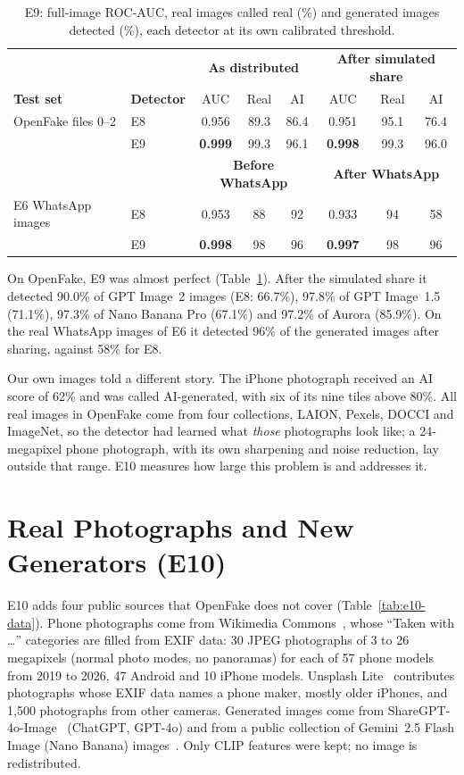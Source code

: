 \documentclass{mnnit}
\begin{document}
\begin{table}[htbp]
\centering
\caption{E9: full-image \mbox{ROC-AUC}, real images called real (\%) and generated images detected (\%), each detector at its own calibrated threshold.}
\label{tab:e9}
\small
\setlength{\tabcolsep}{4pt}
\begin{tabular}{ll|ccc|ccc}
\toprule
 & & \multicolumn{3}{c|}{\textbf{As distributed}} & \multicolumn{3}{c}{\textbf{After simulated share}}\\
\textbf{Test set} & \textbf{Detector} & AUC & Real & AI & AUC & Real & AI\\
\midrule
OpenFake files 0--2 & E8 & 0.956 & 89.3 & 86.4 & 0.951 & 95.1 & 76.4\\
 & E9 & \textbf{0.999} & 99.3 & 96.1 & \textbf{0.998} & 99.3 & 96.0\\
\midrule
 & & \multicolumn{3}{c|}{\textbf{Before WhatsApp}} & \multicolumn{3}{c}{\textbf{After WhatsApp}}\\
E6 WhatsApp images & E8 & 0.953 & 88 & 92 & 0.933 & 94 & 58\\
 & E9 & \textbf{0.998} & 98 & 96 & \textbf{0.997} & 98 & 96\\
\bottomrule
\end{tabular}
\end{table}

On OpenFake, E9 was almost perfect (Table~\ref{tab:e9}). After the
simulated share it detected 90.0\% of GPT Image~2 images (E8: 66.7\%),
97.8\% of GPT Image~1.5 (71.1\%), 97.3\% of Nano Banana Pro (67.1\%) and
97.2\% of Aurora (85.9\%). On the real WhatsApp images of E6 it detected
96\% of the generated images after sharing, against 58\% for E8.

Our own images told a different story. The iPhone photograph received an
AI score of 62\% and was called AI-generated, with six of its nine
tiles above 80\%. All real images in OpenFake come from four collections,
LAION, Pexels, DOCCI and ImageNet, so the detector had learned what \emph{those}
photographs look like; a 24-megapixel phone photograph, with its own
sharpening and noise reduction, lay outside that range. E10 measures how
large this problem is and addresses it.

\section{Real Photographs and New Generators (E10)}
\label{sec:e10}
E10 adds four public sources that OpenFake does not cover
(Table~\ref{tab:e10-data}). Phone photographs come from Wikimedia
Commons~\cite{wikimediacommons}, whose ``Taken with \ldots'' categories are
filled from EXIF data: 30 JPEG photographs of 3 to 26 megapixels (normal
photo modes, no panoramas) for each of 57 phone models from 2019 to 2026,
47 Android and 10 iPhone models. Unsplash Lite~\cite{unsplashlite}
contributes photographs whose EXIF data names a phone maker, mostly older
iPhones, and 1{,}500 photographs from other cameras. Generated images come
from ShareGPT-4o-Image~\cite{chen2025sharegpt4o} (ChatGPT, GPT-4o) and
from a public collection of Gemini~2.5 Flash Image (Nano Banana)
images~\cite{bitmindnanobanana}. Only CLIP features were kept; no image
is redistributed.
\end{document}
